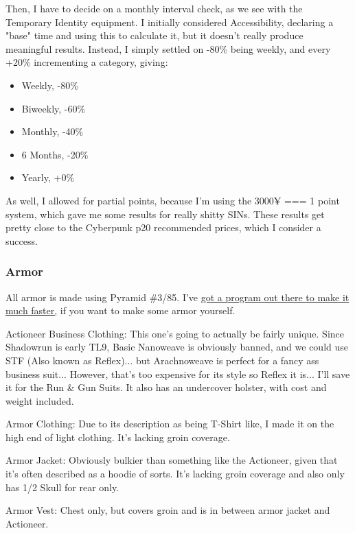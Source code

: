 \begin{multicols*}{2}
	Then, I have to decide on a monthly interval check, as we see with the Temporary Identity equipment. I initially considered Accessibility, declaring a "base" time and using this to calculate it, but it doesn't really produce meaningful results. Instead, I simply settled on -80\% being weekly, and every +20\% incrementing a category, giving:
	
	\begin{itemize}
		\itemsep 0pt
		\item Weekly, -80\%
		\item Biweekly, -60\%
		\item Monthly, -40\%
		\item 6 Months, -20\%
		\item Yearly, +0\%
	\end{itemize}
	
	As well, I allowed for partial points, because I'm using the 3000¥ === 1 point system, which gave me some results for really shitty SINs. These results get pretty close to the Cyberpunk p20 recommended prices, which I consider a success.
	
	\subsubsection{Armor}
	
	All armor is made using Pyramid \#3/85. I've \textcolor{Blue}{\href{https://github.com/ingeanus/GURPS_Eidetic_Memory}{got a program out there to make it much faster,}} if you want to make some armor yourself.
	
	Actioneer Business Clothing: This one's going to actually be fairly unique. Since Shadowrun is early TL9, Basic Nanoweave is obviously banned, and we could use STF (Also known as Reflex)... but Arachnoweave is perfect for a fancy ass business suit... However, that's too expensive for its style so Reflex it is... I'll save it for the Run \& Gun Suits. It also has an undercover holster, with cost and weight included.
	
	Armor Clothing: Due to its description as being T-Shirt like, I made it on the high end of light clothing. It's lacking groin coverage.
	
	Armor Jacket: Obviously bulkier than something like the Actioneer, given that it's often described as a hoodie of sorts. It's lacking groin coverage and also only has 1/2 Skull for rear only.
	
	Armor Vest: Chest only, but covers groin and is in between armor jacket and Actioneer.
	

\end{multicols*}
